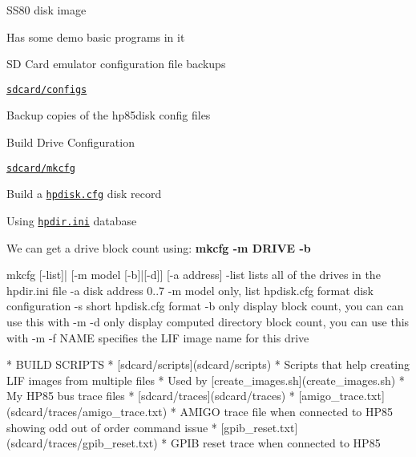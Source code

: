 \begin{DoxyItemize}
\begin{DoxyItemize}
\begin{DoxyItemize}
\begin{DoxyItemize}
\begin{DoxyItemize}
\item S\+S80 disk image
\item Has some demo basic programs in it
\end{DoxyItemize}
\end{DoxyItemize}
\item SD Card emulator configuration file backups
\begin{DoxyItemize}
\item \href{sdcard/configs}{\tt sdcard/configs}
\begin{DoxyItemize}
\item Backup copies of the hp85disk config files
\end{DoxyItemize}
\end{DoxyItemize}
\item Build Drive Configuration
\begin{DoxyItemize}
\item \href{sdcard/mkcfg}{\tt sdcard/mkcfg}
\begin{DoxyItemize}
\item Build a \href{sdcard/hpdisk.cfg}{\tt hpdisk.\+cfg} disk record
\begin{DoxyItemize}
\item Using \href{sdcard/notes/hpdir.ini}{\tt hpdir.\+ini} database
\begin{DoxyItemize}
\item We can get a drive block count using\+: {\bfseries mkcfg -\/m D\+R\+I\+VE -\/b} 
\begin{DoxyPre}
        mkcfg [-list]| [-m model [-b]|[-d]] [-a address]
           -list lists all of the drives in the hpdir.ini file
           -a disk address 0..7
           -m model only, list hpdisk.cfg format disk configuration
           -s short hpdisk.cfg format
           -b only display block count, you can can use this with -m
           -d only display computed directory block count, you can use this with -m
           -f NAME specifies the LIF image name for this drive
\end{DoxyPre}
 \begin{DoxyVerb}  * BUILD SCRIPTS
    * [sdcard/scripts](sdcard/scripts)
      * Scripts that help creating LIF images from multiple files
      * Used by [create_images.sh](create_images.sh)
  * My HP85 bus trace files
    * [sdcard/traces](sdcard/traces)
    * [amigo_trace.txt](sdcard/traces/amigo_trace.txt)
      * AMIGO trace file when connected to HP85 showing odd out of order command issue
    * [gpib_reset.txt](sdcard/traces/gpib_reset.txt)
      * GPIB reset trace when connected to HP85

\end{DoxyVerb}
\end{DoxyItemize}
\end{DoxyItemize}
\end{DoxyItemize}
\end{DoxyItemize}
\end{DoxyItemize}
\end{DoxyItemize}
\end{DoxyItemize}
